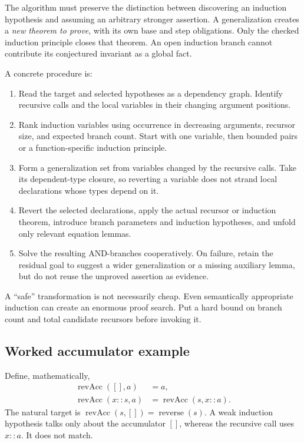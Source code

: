 \documentclass[11pt,a4paper]{article}
\begin{document}
The algorithm must preserve the distinction between discovering an induction
hypothesis and assuming an arbitrary stronger assertion. A generalization
creates a \emph{new theorem to prove}, with its own base and step obligations.
Only the checked induction principle closes that theorem. An open induction
branch cannot contribute its conjectured invariant as a global fact.

A concrete procedure is:
\begin{enumerate}
\item Read the target and selected hypotheses as a dependency graph. Identify
recursive calls and the local variables in their changing argument positions.
\item Rank induction variables using occurrence in decreasing arguments,
recursor size, and expected branch count. Start with one variable, then bounded
pairs or a function-specific induction principle.
\item Form a generalization set from variables changed by the recursive calls.
Take its dependent-type closure, so reverting a variable does not strand local
declarations whose types depend on it.
\item Revert the selected declarations, apply the actual recursor or induction
theorem, introduce branch parameters and induction hypotheses, and unfold only
relevant equation lemmas.
\item Solve the resulting AND-branches cooperatively. On failure, retain the
residual goal to suggest a wider generalization or a missing auxiliary lemma,
but do not reuse the unproved assertion as evidence.
\end{enumerate}

A ``safe'' transformation is not necessarily cheap. Even semantically
appropriate induction can create an enormous proof search. Put a hard bound
on branch count and total candidate recursors before invoking it.

\subsection{Worked accumulator example}

Define, mathematically,
\begin{align*}
 \operatorname{revAcc}([],a)&=a,\\
 \operatorname{revAcc}(x::s,a)&=\operatorname{revAcc}(s,x::a).
\end{align*}
The natural target is
$\operatorname{revAcc}(s,[])=\operatorname{reverse}(s)$.
A weak induction hypothesis talks only about the accumulator $[]$, whereas the
recursive call uses $x::a$. It does not match.
\end{document}
